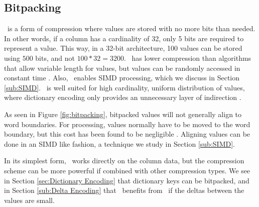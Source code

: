 \subsection{Bitpacking}
\label{sec:Bitpacking}


\bp~is a form of compression where values are stored with no more bits than needed. In other words, if a column has a cardinality of 32, only 5 bits are required to represent a value. This way, in a 32-bit architecture, 100 values can be stored using $500$ bits, and not $100*32 = 3200$. \bp~has lower compression than algorithms that allow variable length for values, but values can be randomly accessed in constant time \cite{Raman2008-gi, Willhalm2013-ri}. Also, \bp~enables SIMD processing, which we discuss in Section \ref{sub:SIMD}. \bp~is well suited for high cardinality, uniform distribution of values, where dictionary encoding only provides an unnecessary layer of indirection \cite{Holloway2008-rr}.

As seen in Figure \ref{fig:bitpacking}, bitpacked values will not generally align to word boundaries. For processing, values normally have to be moved to the word boundary, but this cost has been found to be negligible \cite{Holloway2008-rr}. Aligning values can be done in an SIMD like fashion, a technique we study in Section \ref{sub:SIMD}.

In its simplest form, \bp~works directly on the column data, but the compression scheme can be more powerful if combined with other compression types. We see in Section \ref{sec:Dictionary Encoding} that dictionary keys can be bitpacked, and in Section \ref{sub:Delta Encoding} that \dele~benefits from \bp~if the deltas between the values are small. 

